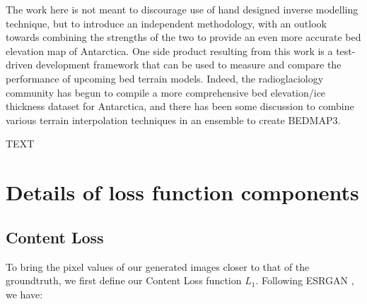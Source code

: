 \documentclass[tc, manuscript]{copernicus}
\begin{document}
The work here is not meant to discourage use of hand designed inverse modelling technique, but to introduce an independent methodology, with an outlook towards combining the strengths of the two to provide an even more accurate bed elevation map of Antarctica.
One side product resulting from this work is a test-driven development framework that can be used to measure and compare the performance of upcoming bed terrain models.
Indeed, the radioglaciology community has begun to compile a more comprehensive bed elevation/ice thickness dataset for Antarctica, and there has been some discussion to combine various terrain interpolation techniques in an ensemble to create BEDMAP3.


\conclusions  %
TEXT












\appendix

\section{Details of loss function components} \label{appendix:A}

\subsection{Content Loss}

To bring the pixel values of our generated images closer to that of the groundtruth, we first define our Content Loss function $L_1$.
Following ESRGAN \citep{WangESRGANEnhancedSuperResolution2018}, we have:
\end{document}
